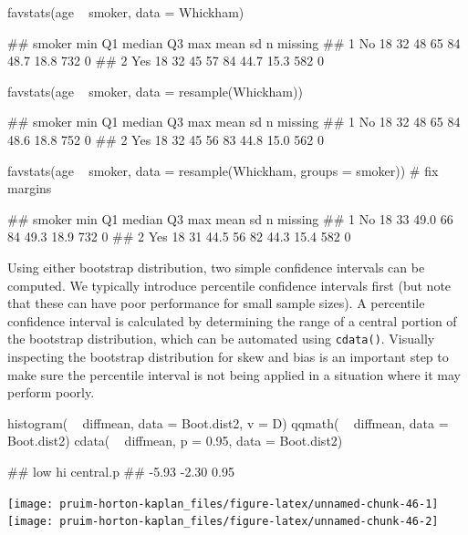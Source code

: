 \begin{Schunk}
\begin{Sinput}
favstats(age ~ smoker, data = Whickham)
\end{Sinput}
\begin{Soutput}
##   smoker min Q1 median Q3 max mean   sd   n missing
## 1     No  18 32     48 65  84 48.7 18.8 732       0
## 2    Yes  18 32     45 57  84 44.7 15.3 582       0
\end{Soutput}
\begin{Sinput}
favstats(age ~ smoker, data = resample(Whickham))
\end{Sinput}
\begin{Soutput}
##   smoker min Q1 median Q3 max mean   sd   n missing
## 1     No  18 32     48 65  84 48.6 18.8 752       0
## 2    Yes  18 32     45 56  83 44.8 15.0 562       0
\end{Soutput}
\begin{Sinput}
favstats(age ~ smoker, data = resample(Whickham, groups = smoker))  # fix margins
\end{Sinput}
\begin{Soutput}
##   smoker min Q1 median Q3 max mean   sd   n missing
## 1     No  18 33   49.0 66  84 49.3 18.9 732       0
## 2    Yes  18 31   44.5 56  82 44.3 15.4 582       0
\end{Soutput}
\end{Schunk}

Using either bootstrap distribution, two simple confidence intervals can
be computed. We typically introduce percentile confidence intervals
first (but note that these can have poor performance for small sample
sizes). A percentile confidence interval is calculated by determining
the range of a central portion of the bootstrap distribution, which can
be automated using \texttt{cdata()}. Visually inspecting the bootstrap
distribution for skew and bias is an important step to make sure the
percentile interval is not being applied in a situation where it may
perform poorly.

\begin{Schunk}
\begin{Sinput}
histogram( ~ diffmean, data = Boot.dist2, v = D)
qqmath( ~ diffmean, data = Boot.dist2)
cdata( ~ diffmean, p = 0.95, data = Boot.dist2)
\end{Sinput}
\begin{Soutput}
##       low        hi central.p 
##     -5.93     -2.30      0.95
\end{Soutput}


\begin{center}\texttt{[image: pruim-horton-kaplan\_files/figure-latex/unnamed-chunk-46-1]} \texttt{[image: pruim-horton-kaplan\_files/figure-latex/unnamed-chunk-46-2]} \end{center}

\end{Schunk}

